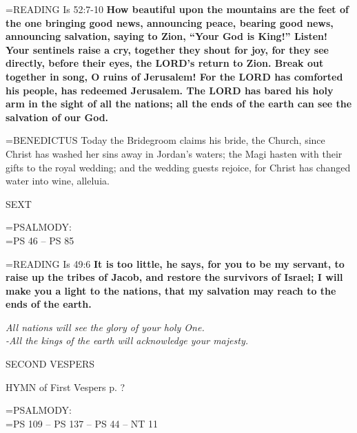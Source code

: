 \hangindent=\parindent \small{\uppercase{READING}}    Is 52:7-10 \textbf{    How beautiful upon the mountains are the feet of the one bringing good news, announcing peace, bearing good news, announcing salvation, saying to Zion, “Your God is King!” Listen! Your sentinels raise a cry, together they shout for joy, for they see directly, before their eyes, the LORD’s return to Zion. Break out together in song, O ruins of Jerusalem! For the LORD has comforted his people, has redeemed Jerusalem. The LORD has bared his holy arm in the sight of all the nations; all the ends of the earth can see the salvation of our God.\\}

\hangindent=\parindent \small{BENEDICTUS 	Today the Bridegroom claims his bride, the Church, since Christ has washed her sins away in Jordan's waters; the Magi hasten with their gifts to the royal wedding; and the wedding guests rejoice, for Christ has changed water into wine, alleluia.\\}

\begin{flushleft}\normalsize SEXT\\\end{flushleft}

\hangindent=\parindent \small{PSALMODY:}\\
\hangindent=\parindent  PS 46 -- PS 85\vspace{0.5em}

\hangindent=\parindent \small{\uppercase{READING}}    Is 49:6 \textbf{    It is too little, he says, for you to be my servant, to raise up the tribes of Jacob, and restore the survivors of Israel; I will make you a light to the nations, that my salvation may reach to the ends of the earth.\\}

\begin{center}
\textit{All nations will see the glory of your holy One.\\
-All the kings of the earth will acknowledge your majesty.}
\end{center}

\begin{flushleft}\normalsize SECOND VESPERS\\\end{flushleft}

HYMN of First Vespers p. ?

\hangindent=\parindent \small{PSALMODY:}\\
\hangindent=\parindent  PS 109 -- PS 137 -- PS 44 -- NT 11\vspace{0.5em}


